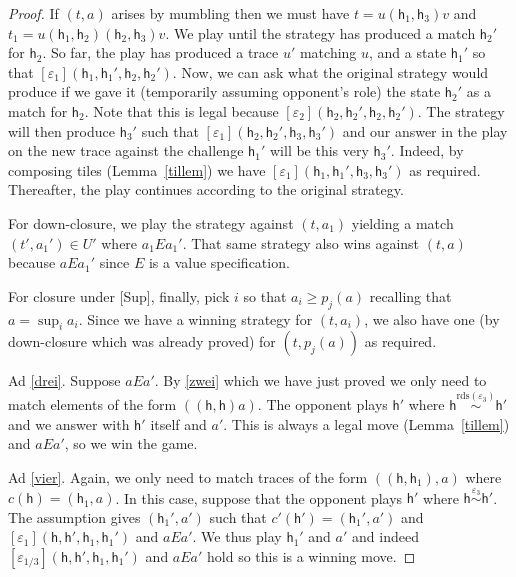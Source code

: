 \documentclass[nocopyrightspace,preprint]{sigplanconf}
\newcommand{\rdsin}[1]{\mathrm{rds}({#1})}
\newcommand{\eff}{\varepsilon}
\newcommand\heap{\ensuremath{\mathsf{h}}\xspace}
\newcommand\h{\heap}
\newcommand\rloc[3]{\ensuremath{#1 \stackrel{#3}{\sim} #2}}
\begin{document}
\begin{proof}
\smallskip 

If $(t,a)$ arises by mumbling then we must have $t=u(\h_1,\h_3)v$ 
and $t_1 = u(\h_1,\h_2)(\h_2,\h_3)v$. We play until the
strategy has produced a match $\h_2'$ for $\h_2$. So far, the play has
produced a trace $u'$ matching $u$, and a state $\h_1'$ so that
$[\eff_1](\h_1,\h_1',\h_2,\h_2')$. Now, we can ask what the original
strategy would produce if we gave it (temporarily assuming opponent's
role) the state $\h_2'$ as a match for $\h_2$. Note that this is legal
because $[\eff_2](\h_2,\h_2',\h_2,\h_2')$. The strategy will then
produce $\h_3'$ such that $[\eff_1](\h_2,\h_2',\h_3,\h_3')$ and our
answer in the play on the new trace against the challenge $\h_1'$ will
be this very $\h_3'$. Indeed, by composing tiles (Lemma~\ref{tillem}) we
have $[\eff_1](\h_1,\h_1',\h_3,\h_3')$ as required. Thereafter, the
play continues according to the original strategy.

\smallskip 

For down-closure, we play the strategy against $(t,a_1)$ yielding a
match $(t',a_1')\in U'$ where $a_1 E a_1'$. That same strategy also
wins against $(t,a)$ because $a E a_1'$ since $E$ is a value
specification.
\smallskip 

For closure under [Sup], finally, pick $i$ so that $a_i\geq p_j(a)$ recalling that $a=\sup_i a_i$. Since we have a winning strategy for $(t,a_i)$, we also have one (by down-closure which was already proved) for $(t,p_j(a))$ as required. 

\medskip

Ad \ref{drei}. Suppose $aEa'$. By \ref{zwei} which we have just proved we only need to match elements of the form $((\heap,\heap)a)$. The opponent plays $\h'$ where $\rloc{\h}{\h'}{\rdsin{\eff_3}}$ and we answer with $\h'$ itself and $a'$. This is always a legal move (Lemma~\ref{tillem}) and  $aEa'$, so we win the game. 

\medskip 
 
Ad \ref{vier}.  Again, we only need to match traces of the form $((\h,\h_1),a)$ where $c(\h)=(\h_1,a)$. In this case, suppose that the opponent plays $\h'$ where $\rloc{\h}{\h'}{\eff_3}$. The assumption gives $(\h_1',a')$ such that $c'(\h')=(\h_1',a')$ and $[\eff_1](\h,\h',\h_1,\h_1')$ and $aEa'$. We thus play $\h_1'$ and $a'$ and indeed $[\eff_{1/3}](\h,\h',\h_1,\h_1')$ and $aEa'$ hold so this is a winning move. 


\end{proof}
\end{document}
